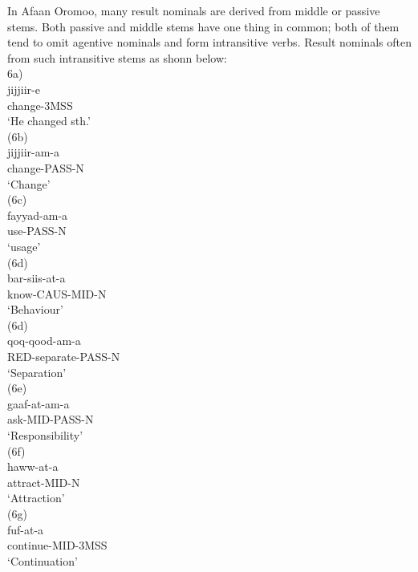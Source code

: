\documentclass[11pt,a4paper]{article}
\begin{document}
In Afaan Oromoo, many result nominals are derived from middle or passive stems. Both passive and middle stems have one thing in common; both of them tend to omit agentive nominals and form intransitive verbs. Result nominals often from such intransitive stems as shonn below:\\

6a) \\
\indent jijjiir-e\\
\indent change-3MSS\\
\indent ‘He changed sth.’\\

(6b) \\
\indent jijjiir-am-a\\
\indent change-PASS-N\\
\indent ‘Change’\\

(6c)\\
\indent fayyad-am-a\\
\indent use-PASS-N\\
\indent ‘usage’\\

(6d) \\
\indent bar-siis-at-a\\
\indent know-CAUS-MID-N\\
\indent ‘Behaviour’\\

(6d) \\
\indent qoq-qood-am-a\\
\indent RED-separate-PASS-N\\
\indent ‘Separation’\\

(6e) \\
\indent gaaf-at-am-a\\
\indent ask-MID-PASS-N\\
\indent ‘Responsibility’\\

(6f)\\
\indent haww-at-a\\
\indent attract-MID-N\\
\indent ‘Attraction’\\

(6g)\\
\indent fuf-at-a\\
\indent continue-MID-3MSS\\
\indent ‘Continuation’\\
\end{document}
